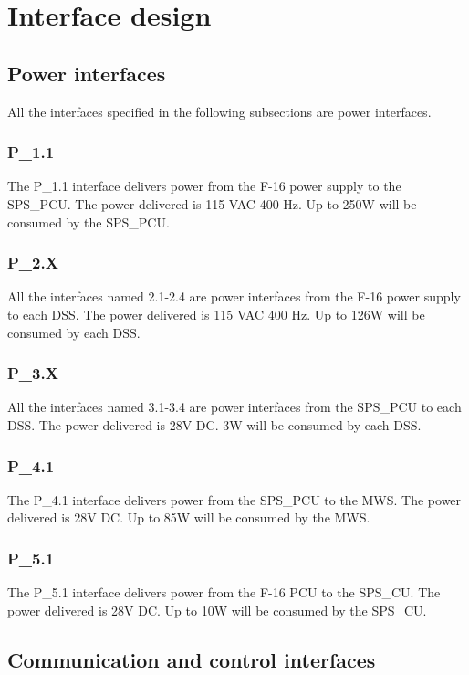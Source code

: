 \documentclass[Main]{subfiles}
\begin{document}
\section{Interface design}

\subsection{Power interfaces}
All the interfaces specified in the following subsections are power interfaces.

\subsubsection{P\_1.1}
The P\_1.1 interface delivers power from the F-16 power supply to the SPS\_PCU. The power delivered is 115 VAC 400 Hz. Up to 250W will be consumed by the SPS\_PCU.

\subsubsection{P\_2.X}
All the interfaces named 2.1-2.4 are power interfaces from the F-16 power supply to each DSS. The power delivered is 115 VAC 400 Hz. Up to 126W will be consumed by each DSS.

\subsubsection{P\_3.X}
All the interfaces named 3.1-3.4 are power interfaces from the SPS\_PCU to each DSS. The power delivered is 28V DC. 3W will be consumed by each DSS.

\subsubsection{P\_4.1}
The P\_4.1 interface delivers power from the SPS\_PCU to the MWS. The power delivered is 28V DC. Up to 85W will be consumed by the MWS.

\subsubsection{P\_5.1}
The P\_5.1 interface delivers power from the F-16 PCU to the SPS\_CU. The power delivered is 28V DC. Up to 10W will be consumed by the SPS\_CU.


\subsection{Communication and control interfaces}
\end{document}
